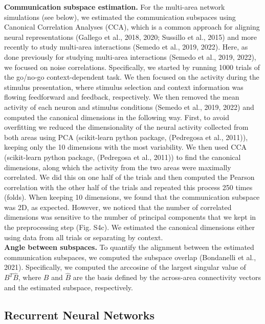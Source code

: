 \documentclass[12pt]{article}
\begin{document}
\textbf{Communication subspace estimation.} For the multi-area network simulations (see below), we estimated the communication subspaces using Canonical Correlation Analyses (CCA), which is a common approach for aligning neural representations (Gallego et al., 2018, 2020; Sussillo et al., 2015) and more recently to study multi-area interactions (Semedo et al., 2019, 2022). Here, as done previously for studying multi-area interactions (Semedo et al., 2019, 2022), we focused on noise correlations. Specifically, we started by running 1000 trials of the go/no-go context-dependent task. We then focused on the activity during the stimulus presentation, where stimulus selection and context information was flowing feedforward and feedback, respectively. We then removed the mean activity of each neuron and stimulus conditions (Semedo et al., 2019, 2022) and computed the canonical dimensions in the following way. First, to avoid overfitting we reduced the dimensionality of the neural activity collected from both areas using PCA (scikit-learn python package, (Pedregosa et al., 2011)), keeping only the 10 dimensions with the most variability. We then used CCA (scikit-learn python package, (Pedregosa et al., 2011)) to find the canonical dimensions, along which the activity from the two areas were maximally correlated. We did this on one half of the trials and then computed the Pearson correlation with the other half of the trials and repeated this process 250 times (folds). When keeping 10 dimensions, we found that the communication subspace was 2D, as expected. However, we noticed that the number of correlated dimensions was sensitive to the number of principal components that we kept in the preprocessing step (Fig. S4c). We estimated the canonical dimensions either using data from all trials or separating by context. \\


\textbf{Angle between subspaces.} To quantify the alignment between the estimated communication subspaces, we computed the subspace overlap (Bondanelli et al., 2021). Specifically, we computed the arccosine of the largest singular value of $ B^T \hat B $, where $B$ and $\hat B$ are the basis defined by the across-area connectivity vectors and the estimated subspace, respectively. \\

\subsection*{Recurrent Neural Networks}
\end{document}
